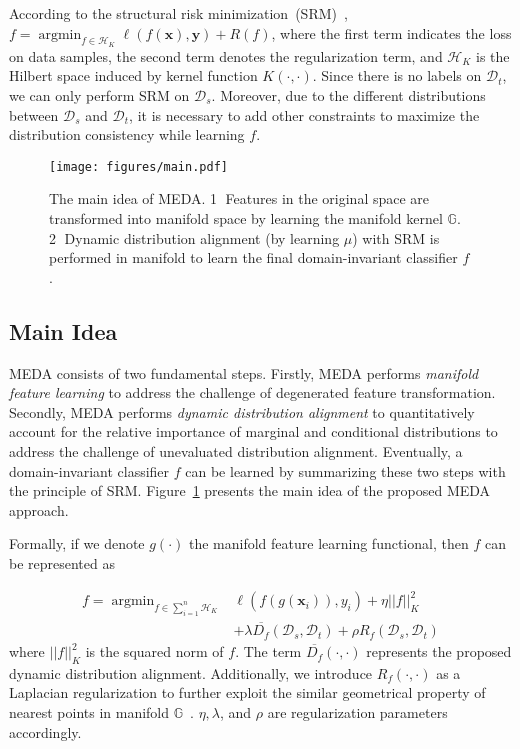\documentclass[sigconf]{acmart}
\begin{document}
According to the structural risk minimization~(SRM)~\cite{vapnik1998statistical}, $f = \mathop{\arg\min}_{f \in \mathcal{H}_{K}} \ell(f(\mathbf{x}),\mathbf{y}) + R(f)$, where the first term indicates the loss on data samples, the second term denotes the regularization term, and $\mathcal{H}_{K}$ is the Hilbert space induced by kernel function $K(\cdot,\cdot)$. Since there is no labels on $\mathcal{D}_t$, we can only perform SRM on $\mathcal{D}_s$. Moreover, due to the different distributions between $\mathcal{D}_s$ and $\mathcal{D}_t$, it is necessary to add other constraints to maximize the distribution consistency while learning $f$.

\begin{figure}[t]
	\centering
	\texttt{[image: figures/main.pdf]}
	\caption{The main idea of MEDA. \textcircled{1} Features in the original space are transformed into manifold space by learning the manifold kernel $\mathbb{G}$. \textcircled{2} Dynamic distribution alignment (by learning $\mu$) with SRM is performed in manifold to learn the final domain-invariant classifier $f$.}
	\label{fig-main}
\end{figure}

\subsection{Main Idea}


MEDA consists of two fundamental steps. Firstly, MEDA performs \textit{manifold feature learning} to address the challenge of degenerated feature transformation. Secondly, MEDA performs \textit{dynamic distribution alignment} to quantitatively account for the relative importance of marginal and conditional distributions to address the challenge of unevaluated distribution alignment. Eventually, a domain-invariant classifier $f$ can be learned by summarizing these two steps with the principle of SRM. Figure~\ref{fig-main} presents the main idea of the proposed MEDA approach. 

Formally, if we denote $g(\cdot)$ the manifold feature learning functional, then $f$ can be represented as

\begin{equation}
\label{equ-f-orig}
\begin{split}
f = \mathop{\arg\min}_{f \in \sum_{i=1}^{n} \mathcal{H}_{K}} &\ell(f(g(\mathbf{x}_i)),y_i) + \eta ||f||^2_K \\
&+ \lambda \overline{D_f}(\mathcal{D}_s,\mathcal{D}_t) + \rho R_f(\mathcal{D}_s,\mathcal{D}_t)
\end{split}
\end{equation}
where $||f||^2_K$ is the squared norm of $f$. The term $\overline{D_f}(\cdot,\cdot)$ represents the proposed dynamic distribution alignment. Additionally, we introduce $R_f(\cdot,\cdot)$ as a Laplacian regularization to further exploit the similar geometrical property of nearest points in manifold $\mathbb{G}$~\cite{belkin2006manifold}. $\eta,\lambda$, and $\rho$ are regularization parameters accordingly.
\end{document}
